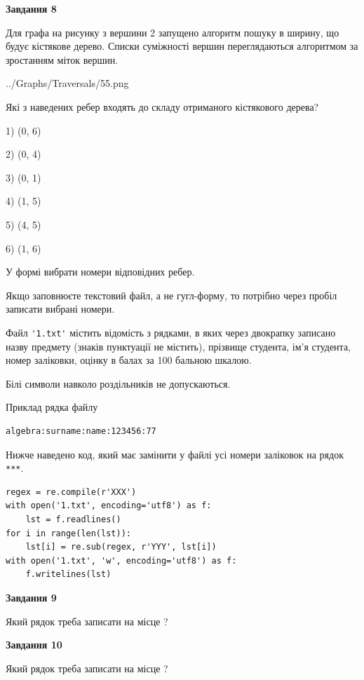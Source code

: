 \documentclass[12pt, ukrainian]{article}
\def\code#1{\Verb!#1!}
\begin{document}
{\begin {large}
{\begin {center}\textbf{Завдання 8}\end {center}}\par
Для графа на рисунку з вершини 2 запущено алгоритм пошуку в ширину, що будує кістякове дерево. Списки суміжності вершин переглядаються алгоритмом за зростанням міток вершин.\par
\begin{center}
	{../Graphs/Traversals/55.png}
\end{center}
\par Які з наведених ребер входять до складу отриманого кістякового дерева?\par
1) (0, 6)\par
2) (0, 4)\par
3) (0, 1)\par
4) (1, 5)\par
5) (4, 5)\par
6) (1, 6)\par
{\vskip 15pt} У формі вибрати номери відповідних ребер.


Якщо заповнюєте текстовий файл, а не гугл-форму, то потрібно через пробіл записа\-ти вибрані номери.\par
\newpage


Файл \code{'1.txt'} містить відомість з рядками, в яких через двокрапку записа\-но назву предмету (знаків пунктуації не містить), прізвище студента, ім'я студента, номер залі\-ков\-ки, оцінку в балах за 100 бальною шкалою.

Білі символи навколо роздільників не допускаються.

Приклад рядка файлу



\begin{verbatim}
algebra:surname:name:123456:77
\end{verbatim}


Нижче наведено код, який має замінити у файлі усі номери заліковок на рядок \code{***}.



\begin{verbatim}
regex = re.compile(r'XXX')
with open('1.txt', encoding='utf8') as f:
    lst = f.readlines()
for i in range(len(lst)):
    lst[i] = re.sub(regex, r'YYY', lst[i])
with open('1.txt', 'w', encoding='utf8') as f:
    f.writelines(lst)
\end{verbatim}




{\begin {center}\textbf{Завдання 9}\end {center}}\par
Який рядок треба записати на місце  ?\par
\vspace{5mm}


{\begin {center}\textbf{Завдання 10}\end {center}}\par
Який рядок треба записати на місце  ?\par


\newpage


\end {large}}
\end{document}
